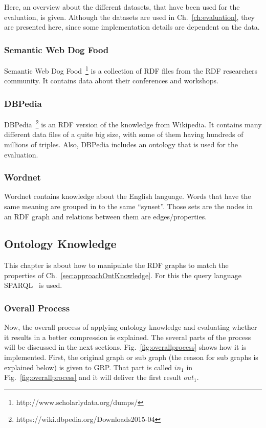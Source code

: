 Here, an overview about the different datasets, that have been used for the evaluation, is given. Although the datasets are used in Ch.~\ref{ch:evaluation}, they are presented here, since some implementation details are dependent on the data.

\subsubsection{Semantic Web Dog Food}

Semantic Web Dog Food~\footnote{http://www.scholarlydata.org/dumps/} is a collection of RDF files from the RDF researchers community. It contains data about their conferences and workshops.

\subsubsection{DBPedia}

DBPedia~\footnote{https://wiki.dbpedia.org/Downloads2015-04} is an RDF version of the knowledge from Wikipedia. It contains many different data files of a quite big size, with some of them having hundreds of millions of triples. Also, DBPedia includes an ontology that is used for the evaluation.

\subsubsection{Wordnet}

Wordnet contains knowledge about the English language. Words that have the same meaning are grouped in to the same \enquote{synset}. Those sets are the nodes in an RDF graph and relations between them are edges/properties.

\subsection{Ontology Knowledge}\label{sec:implementationOntKnowledge}

This chapter is about how to manipulate the RDF graphs to match the properties of Ch.~\ref{sec:approachOntKnowledge}. For this the query language SPARQL~\cite{sparql} is used.


\subsubsection{Overall Process}
Now, the overall process of applying ontology knowledge and evaluating whether it results in a better compression is explained. The several parts of the process will be discussed in the next sections. Fig.~\ref{fig:overallprocess} shows how it is implemented. First, the original graph or sub graph (the reason for sub graphs is explained below) is given to GRP. That part is called $in_1$ in Fig.~\ref{fig:overallprocess} and it will deliver the first result $out_1$.

